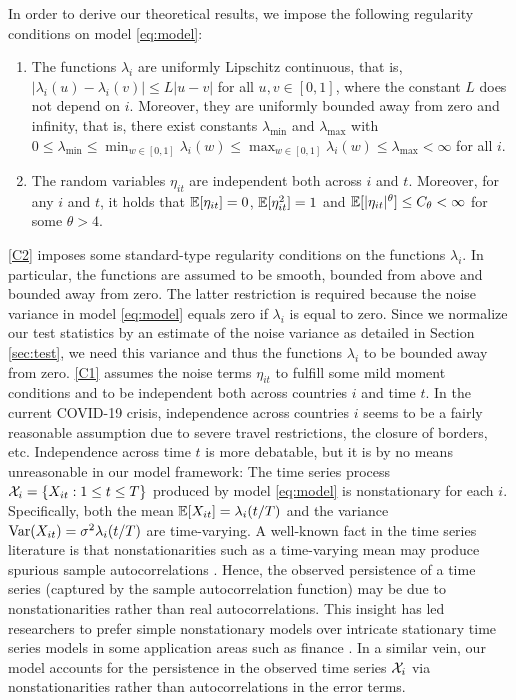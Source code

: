 \documentclass[a4paper,12pt]{article}
\numberwithin{equation}{section}
\begin{document}
In order to derive our theoretical results, we impose the following regularity conditions on model \eqref{eq:model}:
\begin{enumerate}[label=(C\arabic*),leftmargin=1.0cm]
\item \label{C2} The functions $\lambda_i$ are uniformly Lipschitz continuous, that is, $|\lambda_i(u) - \lambda_i(v)| \le L |u-v|$ for all $u, v \in [0,1]$, where the constant $L$ does not depend on $i$. Moreover, they are uniformly bounded away from zero and infinity, that is, there exist constants $\lambda_{\min}$ and $\lambda_{\max}$ with $0 \le \lambda_{\min} \le \min_{w \in [0,1]} \lambda_i(w) \le \max_{w \in [0,1]} \lambda_i(w) \le \lambda_{\max} < \infty$ for all $i$. 
\item \label{C1} The random variables $\eta_{it}$ are independent both across $i$ and $t$. Moreover, for any $i$ and $t$, it holds that $\mathbb{E}[\eta_{it}] = 0$, $\mathbb{E}[\eta_{it}^2] = 1$ and $\mathbb{E}[|\eta_{it}|^\theta] \le C_\theta < \infty$ for some $\theta > 4$. 
\end{enumerate}
\ref{C2} imposes some standard-type regularity conditions on the functions $\lambda_i$. In particular, the functions are assumed to be smooth, bounded from above and bounded away from zero. The latter restriction is required because the noise variance in model \eqref{eq:model} equals zero if $\lambda_i$ is equal to zero. Since we normalize our test statistics by an estimate of the noise variance as detailed in Section \ref{sec:test}, we need this variance and thus the functions $\lambda_i$ to be bounded away from zero. \ref{C1} assumes the noise terms $\eta_{it}$ to fulfill some mild moment conditions and to be independent both across countries $i$ and time $t$. In the current COVID-19 crisis, independence across countries $i$ seems to be a fairly reasonable assumption due to severe travel restrictions, the closure of borders, etc. Independence across time $t$ is more debatable, but it is by no means unreasonable in our model framework: The time series process $\mathcal{X}_i = \{X_{it}: 1 \le t \le T\}$ produced by model \eqref{eq:model} is nonstationary for each $i$. Specifically, both the mean $\mathbb{E}[X_{it}] = \lambda_i(t/T)$ and the variance $\textnormal{Var}(X_{it}) = \sigma^2 \lambda_i(t/T)$ are time-varying. A well-known fact in the time series literature is that nonstationarities such as a time-varying mean may produce spurious sample autocorrelations \citep[cp.\ e.g.][]{MikoschStarica2004, Fryzlewicz2008}. Hence, the observed persistence of a time series (captured by the sample autocorrelation function) may be due to nonstationarities rather than real autocorrelations. This insight has led researchers to prefer simple nonstationary models over intricate stationary time series models in some application areas such as finance \citep[cp.][]{MikoschStarica2000, MikoschStarica2004, Fryzlewicz2006, HafnerLinton2010}. In a similar vein, our model accounts for the persistence in the observed time series $\mathcal{X}_i$ via nonstationarities rather than autocorrelations in the error terms. 
\end{document}
